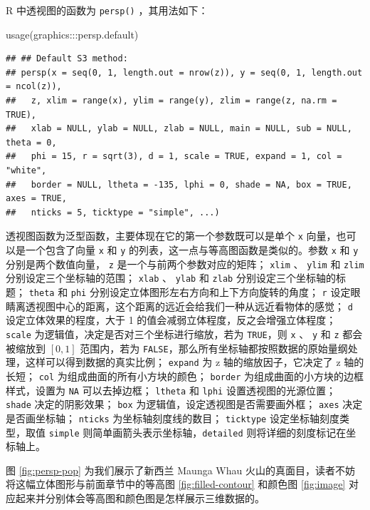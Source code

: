 \documentclass[
  b5paper,
  UTF8,twoside]{book}
\newenvironment{Shaded}{\begin{snugshade}}{\end{snugshade}}
\newcommand{\FunctionTok}[1]{\textcolor[rgb]{0.00,0.00,0.00}{#1}}
\newcommand{\NormalTok}[1]{#1}
\newcommand{\SpecialCharTok}[1]{\textcolor[rgb]{0.00,0.00,0.00}{#1}}
\begin{document}
R 中透视图的函数为 \texttt{persp()} ，其用法如下：

\begin{Shaded}
\begin{Highlighting}[]
\FunctionTok{usage}\NormalTok{(graphics}\SpecialCharTok{:::}\NormalTok{persp.default)}
\end{Highlighting}
\end{Shaded}

\begin{verbatim}
## ## Default S3 method:
## persp(x = seq(0, 1, length.out = nrow(z)), y = seq(0, 1, length.out = ncol(z)),
##   z, xlim = range(x), ylim = range(y), zlim = range(z, na.rm = TRUE),
##   xlab = NULL, ylab = NULL, zlab = NULL, main = NULL, sub = NULL, theta = 0,
##   phi = 15, r = sqrt(3), d = 1, scale = TRUE, expand = 1, col = "white",
##   border = NULL, ltheta = -135, lphi = 0, shade = NA, box = TRUE, axes = TRUE,
##   nticks = 5, ticktype = "simple", ...)
\end{verbatim}

透视图函数为泛型函数，主要体现在它的第一个参数既可以是单个 \texttt{x} 向量，也可以是一个包含了向量 \texttt{x} 和 \texttt{y} 的列表，这一点与等高图函数是类似的。参数 \texttt{x} 和 \texttt{y} 分别是两个数值向量， \texttt{z} 是一个与前两个参数对应的矩阵； \texttt{xlim} 、 \texttt{ylim} 和 \texttt{zlim} 分别设定三个坐标轴的范围； \texttt{xlab} 、 \texttt{ylab} 和 \texttt{zlab} 分别设定三个坐标轴的标题； \texttt{theta} 和 \texttt{phi} 分别设定立体图形左右方向和上下方向旋转的角度； \texttt{r} 设定眼睛离透视图中心的距离，这个距离的远近会给我们一种从远近看物体的感觉； \texttt{d} 设定立体效果的程度，大于 1 的值会减弱立体程度，反之会增强立体程度； \texttt{scale} 为逻辑值，决定是否对三个坐标进行缩放，若为 \texttt{TRUE}，则 \texttt{x} 、 \texttt{y} 和 \texttt{z} 都会被缩放到 \([0, 1]\) 范围内，若为 \texttt{FALSE}，那么所有坐标轴都按照数据的原始量纲处理，这样可以得到数据的真实比例； \texttt{expand} 为 z 轴的缩放因子，它决定了 z 轴的长短； \texttt{col} 为组成曲面的所有小方块的颜色； \texttt{border} 为组成曲面的小方块的边框样式，设置为 \texttt{NA} 可以去掉边框； \texttt{ltheta} 和 \texttt{lphi} 设置透视图的光源位置； \texttt{shade} 决定的阴影效果； \texttt{box} 为逻辑值，设定透视图是否需要画外框； \texttt{axes} 决定是否画坐标轴； \texttt{nticks} 为坐标轴刻度线的数目； \texttt{ticktype} 设定坐标轴刻度类型，取值 \texttt{\textquotesingle{}simple\textquotesingle{}} 则简单画箭头表示坐标轴，\texttt{\textquotesingle{}detailed\textquotesingle{}} 则将详细的刻度标记在坐标轴上。

图 \ref{fig:persp-pop} 为我们展示了新西兰 Maunga Whau 火山的真面目，读者不妨将这幅立体图形与前面章节中的等高图 \ref{fig:filled-contour} 和颜色图 \ref{fig:image} 对应起来并分别体会等高图和颜色图是怎样展示三维数据的。
\end{document}
